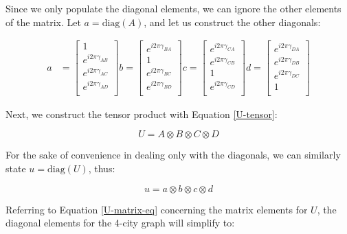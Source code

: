 \documentclass[msc,oneside]{ubcthesis}
\begin{document}
	Since we only populate the diagonal elements, we can ignore the other elements of the matrix. Let $ a = \mathrm{diag}(A)$, and let us construct the other diagonals:
	
	\begin{align*}	
		a & = \begin{bmatrix}
			1 \\
			e^{i2\pi\gamma_{AB}} \\
			e^{i2\pi\gamma_{AC}} \\
			e^{i2\pi\gamma_{AD}} \\
		\end{bmatrix} 
		b  = \begin{bmatrix}
			e^{i2\pi\gamma_{BA}} \\
			1 \\
			e^{i2\pi\gamma_{BC}} \\
			e^{i2\pi\gamma_{BD}} \\
		\end{bmatrix}
		c  = \begin{bmatrix}
			e^{i2\pi\gamma_{CA}} \\
			e^{i2\pi\gamma_{CB}} \\
			1 \\
			e^{i2\pi\gamma_{CD}} \\
		\end{bmatrix} 
		d = \begin{bmatrix}
			e^{i2\pi\gamma_{DA}} \\
			e^{i2\pi\gamma_{DB}} \\
			e^{i2\pi\gamma_{DC}} \\
			1 \\
		\end{bmatrix} 						 			
	\end{align*}
	
	
	Next, we construct the tensor product with Equation \eqref{U-tensor}:
	
	\begin{equation}\label{4-city-matrix-tensor}
	 U = A \otimes B \otimes C \otimes D
	\end{equation}
	
	For the sake of convenience in dealing only with the diagonals, we can similarly state $ u = \mathrm{diag}(U)$, thus:
	
	$$ u = a \otimes b \otimes c \otimes d$$
	
	
	Referring to Equation \eqref{U-matrix-eq} concerning the matrix elements for $U$,  the diagonal elements for the 4-city graph will simplify to:
	
\end{document}
